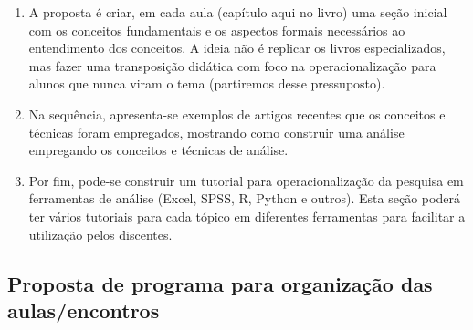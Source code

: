\documentclass[
]{book}
\providecommand{\tightlist}{%
  \setlength{\itemsep}{0pt}\setlength{\parskip}{0pt}}
\begin{document}
\begin{enumerate}
\def\labelenumi{\arabic{enumi}.}
\tightlist
\item
  A proposta é criar, em cada aula (capítulo aqui no livro) uma seção inicial com os conceitos fundamentais e os aspectos formais necessários ao entendimento dos conceitos. A ideia não é replicar os livros especializados, mas fazer uma transposição didática com foco na operacionalização para alunos que nunca viram o tema (partiremos desse pressuposto).
\item
  Na sequência, apresenta-se exemplos de artigos recentes que os conceitos e técnicas foram empregados, mostrando como construir uma análise empregando os conceitos e técnicas de análise.
\item
  Por fim, pode-se construir um tutorial para operacionalização da pesquisa em ferramentas de análise (Excel, SPSS, R, Python e outros). Esta seção poderá ter vários tutoriais para cada tópico em diferentes ferramentas para facilitar a utilização pelos discentes.
\end{enumerate}

\hypertarget{proposta-de-programa-para-organizauxe7uxe3o-das-aulasencontros}{%
\subsection{Proposta de programa para organização das aulas/encontros}\label{proposta-de-programa-para-organizauxe7uxe3o-das-aulasencontros}}
\end{document}
